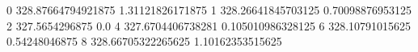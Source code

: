 0 328.87664794921875 1.31121826171875
1 328.26641845703125 0.70098876953125
2 327.5654296875 0.0
4 327.6704406738281 0.105010986328125
6 328.10791015625 0.54248046875
8 328.66705322265625 1.10162353515625
